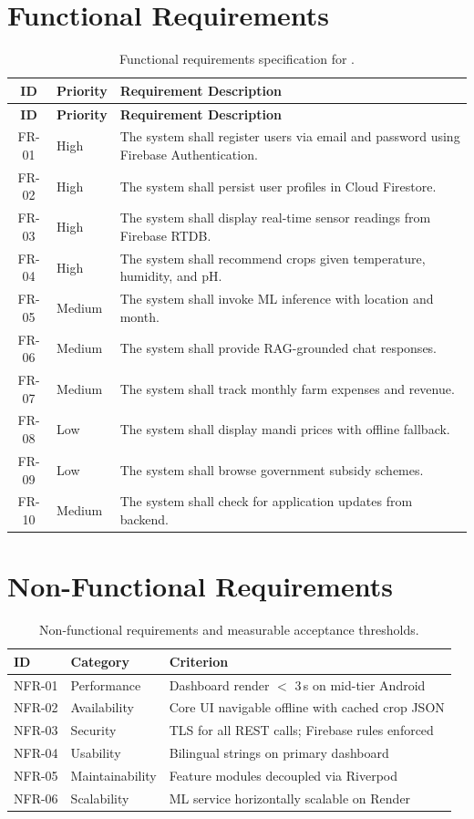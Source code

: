 \section{Functional Requirements}
\label{sec:fr}
\begin{longtable}{@{}clp{8.5cm}@{}}
\caption{Functional requirements specification for \HydroSmart{}.}
\label{tab:functional_requirements}\\
\toprule
\textbf{ID} & \textbf{Priority} & \textbf{Requirement Description} \\
\midrule
\endfirsthead
\toprule
\textbf{ID} & \textbf{Priority} & \textbf{Requirement Description} \\
\midrule
\endhead
FR-01 & High & The system shall register users via email and password using Firebase Authentication. \\
FR-02 & High & The system shall persist user profiles in Cloud Firestore. \\
FR-03 & High & The system shall display real-time sensor readings from Firebase RTDB. \\
FR-04 & High & The system shall recommend crops given temperature, humidity, and pH. \\
FR-05 & Medium & The system shall invoke ML inference with location and month. \\
FR-06 & Medium & The system shall provide RAG-grounded chat responses. \\
FR-07 & Medium & The system shall track monthly farm expenses and revenue. \\
FR-08 & Low & The system shall display mandi prices with offline fallback. \\
FR-09 & Low & The system shall browse government subsidy schemes. \\
FR-10 & Medium & The system shall check for application updates from backend. \\
\bottomrule
\end{longtable}

\section{Non-Functional Requirements}
\begin{table}[htbp]
\centering
\caption{Non-functional requirements and measurable acceptance thresholds.}
\label{tab:nfr}
\begin{tabular}{@{}lll@{}}
\toprule
\textbf{ID} & \textbf{Category} & \textbf{Criterion} \\
\midrule
NFR-01 & Performance & Dashboard render $<$ 3\,s on mid-tier Android \\
NFR-02 & Availability & Core UI navigable offline with cached crop JSON \\
NFR-03 & Security & TLS for all REST calls; Firebase rules enforced \\
NFR-04 & Usability & Bilingual strings on primary dashboard \\
NFR-05 & Maintainability & Feature modules decoupled via Riverpod \\
NFR-06 & Scalability & ML service horizontally scalable on Render \\
\bottomrule
\end{tabular}
\end{table}

